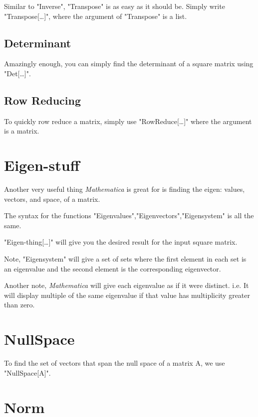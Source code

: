 \documentclass[11pt,letterpaper,twoside,titlepage]{report}
\newcommand{\Mathematica}{\textit{Mathematica} }
\begin{document}
					Similar to "Inverse", "Transpose" is as easy as it should be.  Simply write "Transpose[\dots]", where the argument of "Transpose" is a list.
								
				\subsection{Determinant}
								
					Amazingly enough, you can simply find the determinant of a square matrix using "Det[\dots]".
								
				\subsection{Row Reducing}
								
					To quickly row reduce a matrix, simply use  "RowReduce[\dots]" where the argument is a matrix.
							
			\section{Eigen-stuff}
					
				Another very useful thing \Mathematica is great for is finding the eigen: values, vectors, and space, of a matrix.
						
				The syntax for the functions "Eigenvalues","Eigenvectors","Eigensystem" is all the same.
						
				"Eigen-thing[\dots]" will give you the desired result for the input square matrix.
						
				Note, "Eigensystem" will give a set of sets where the first element in each set is an eigenvalue and the second element is the corresponding eigenvector.
						
				Another note, \Mathematica will give each eigenvalue as if it were distinct.  i.e. It will display multiple of the same eigenvalue if that value has multiplicity greater than zero.
						
			\section{NullSpace}
						
				To find the set of vectors that span the null space of a matrix A, we use "NullSpace[A]".
						
			\section{Norm}
						
\end{document}
